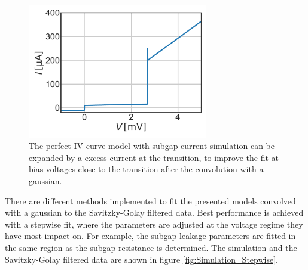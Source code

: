 \documentclass[]{article}
\begin{document}
\begin{figure}
\centering
\includegraphics[width=0.7\textwidth]{./../IV_Curve_Simulations_Unit_Test/2020_01_06//ExcessCriticalCurrent_SubgapLeakage_and_SubgapLeakageOffset.pdf}
\caption{The perfect IV curve model with subgap current simulation can be expanded by a excess current at the transition, to improve the fit at bias voltages close to the transition after the convolution with a gaussian. }
\label{fig:ExcessCriticalCurrent_SubgapLeakage_and_SubgapLeakageOffset}
\end{figure}

There are different methods implemented to fit the presented models convolved with a gaussian to the Savitzky-Golay filtered data. Best performance is achieved with a stepwise fit, where the parameters are adjusted at the voltage regime they have most impact on. For example, the subgap leakage parameters are fitted in the same region as the subgap resistance is determined. The simulation and the Savitzky-Golay filtered data are shown in figure \ref{fig:Simulation_Stepwise}.\par
\end{document}
